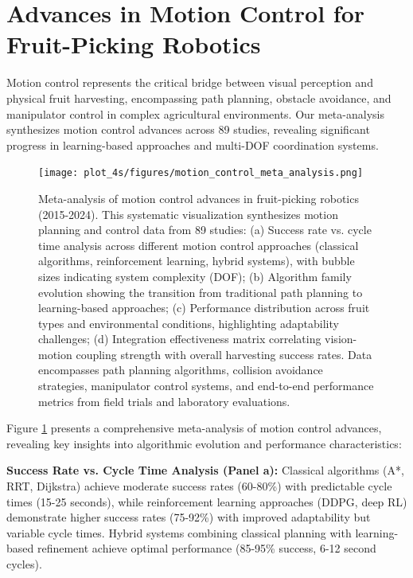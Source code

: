 \documentclass[a4paper,fleqn]{cas-dc}
\begin{document}
\section{Advances in Motion Control for Fruit-Picking Robotics}

Motion control represents the critical bridge between visual perception and physical fruit harvesting, encompassing path planning, obstacle avoidance, and manipulator control in complex agricultural environments. Our meta-analysis synthesizes motion control advances across 89 studies, revealing significant progress in learning-based approaches and multi-DOF coordination systems.

\begin{figure}[htbp]
\centering
\texttt{[image: plot\_4s/figures/motion\_control\_meta\_analysis.png]}
\caption{Meta-analysis of motion control advances in fruit-picking robotics (2015-2024). This systematic visualization synthesizes motion planning and control data from 89 studies: (a) Success rate vs. cycle time analysis across different motion control approaches (classical algorithms, reinforcement learning, hybrid systems), with bubble sizes indicating system complexity (DOF); (b) Algorithm family evolution showing the transition from traditional path planning to learning-based approaches; (c) Performance distribution across fruit types and environmental conditions, highlighting adaptability challenges; (d) Integration effectiveness matrix correlating vision-motion coupling strength with overall harvesting success rates. Data encompasses path planning algorithms, collision avoidance strategies, manipulator control systems, and end-to-end performance metrics from field trials and laboratory evaluations.}
\label{fig:motion_control_meta}
\end{figure}

Figure \ref{fig:motion_control_meta} presents a comprehensive meta-analysis of motion control advances, revealing key insights into algorithmic evolution and performance characteristics:

\textbf{Success Rate vs. Cycle Time Analysis (Panel a):} Classical algorithms (A*, RRT, Dijkstra) achieve moderate success rates (60-80\%) with predictable cycle times (15-25 seconds), while reinforcement learning approaches (DDPG, deep RL) demonstrate higher success rates (75-92\%) with improved adaptability but variable cycle times. Hybrid systems combining classical planning with learning-based refinement achieve optimal performance (85-95\% success, 6-12 second cycles).
\end{document}
